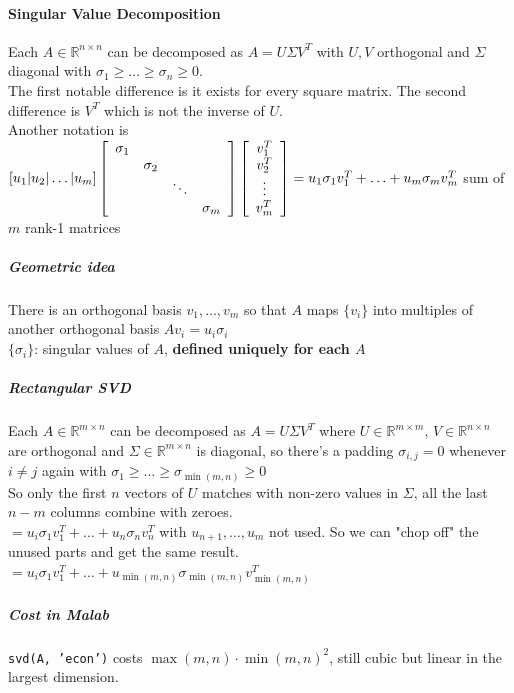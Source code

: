 \documentclass[10pt]{report}
\begin{document}
\paragraph{Singular Value Decomposition} Each $A\in \mathbb{R}^{n\times n}$ can be decomposed as $A = U\Sigma V^T$ with $U, V$ orthogonal and $\Sigma$ diagonal with $\sigma_1 \geq \ldots \geq \sigma_n \geq 0$.\\
The first notable difference is it exists for every square matrix. The second difference is $V^T$ which is not the inverse of $U$.\\
Another notation is $[u_1|u_2|\ldots|u_m]\left[\begin{array}{c c c c}
\sigma_1\\ & \sigma_2\\ & & \ddots\\ & & & \sigma_m
\end{array} \right]\left[\begin{array}{c}
v_1^T\\v_2^T\\\vdots\\v_m^T
\end{array} \right] = u_1\sigma_1 v_1^T + \ldots + u_m\sigma_m v_m^T$ sum of $m$ rank-1 matrices\\
\subparagraph{Geometric idea} There is an orthogonal basis $v_1,\ldots, v_m$ so that $A$ maps $\{v_i\}$ into multiples of another orthogonal basis $A v_i = u_i \sigma_i$\\
$\{\sigma_i\}$: singular values of $A$, \textbf{defined uniquely for each $A$}\\
\subparagraph{Rectangular SVD} Each $A\in \mathbb{R}^{m\times n}$ can be decomposed as $A = U\Sigma V^T$ where $U\in \mathbb{R}^{m\times m}$, $V \in \mathbb{R}^{n\times n}$ are orthogonal and $\Sigma\in \mathbb{R}^{m\times n}$ is diagonal, so there's a padding $\sigma_{i,j} = 0$ whenever $i\neq j$ again with $\sigma_1 \geq \ldots \geq \sigma_{\min(m, n)} \geq 0$\\
So only the first $n$ vectors of $U$ matches with non-zero values in $\Sigma$, all the last $n-m$ columns combine with zeroes.\\
$= u_i\sigma_1 v_1^T + \ldots + u_n \sigma_n v_n^T$ with $u_{n+1},\ldots, u_m$ not used. So we can "chop off" the unused parts and get the same result.\\
$= u_i\sigma_1 v_1^T + \ldots + u_{\min(m, n)} \sigma_{\min(m, n)} v_{\min(m, n)}^T$
\subparagraph{Cost in Malab} \texttt{svd(A, 'econ')} costs $\max(m,n)\cdot \min(m,n)^2$, still cubic but linear in the largest dimension.\\
\end{document}
